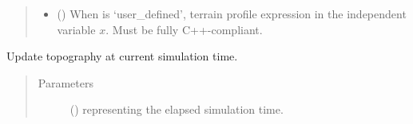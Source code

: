 \documentclass[letterpaper,10pt,english]{sphinxmanual}
\begin{document}
\begin{fulllineitems}
\begin{fulllineitems}
\begin{quote}
\begin{description}
\begin{itemize}
\item {} 
 () \textendash{} When  is ‘user\_defined’, terrain profile expression in the independent variable \(x\).
Must be fully C++-compliant.

\end{itemize}

\end{description}\end{quote}

\end{fulllineitems}


\begin{fulllineitems}
\label{\detokenize{api:grids.topography.Topography1d.update}}
Update topography at current simulation time.
\begin{quote}\begin{description}
\item[{Parameters}] \leavevmode
{} () \textendash{}  representing the elapsed simulation time.

\end{description}\end{quote}

\end{fulllineitems}


\end{fulllineitems}

\end{document}
